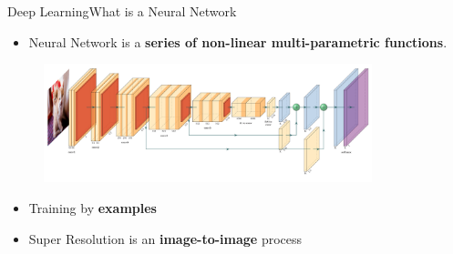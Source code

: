 \documentclass[10pt, unicode]{beamer}
\begin{document}
\begin{frame}{Deep Learning}{What is a Neural Network}

  \begin{itemize}
    \item Neural Network is a \textbf{series of non-linear multi-parametric functions}.
  \end{itemize}

  \begin{figure}[hbp]
    \centering
    \includegraphics[width=0.85\textwidth, height=0.29\textwidth]{images/net_scheme.png}
  \end{figure}
  
  \begin{itemize}
   \item Training by \textbf{examples}
   \item Super Resolution is an \textbf{image-to-image} process
  \end{itemize}

\end{frame}
\end{document}
